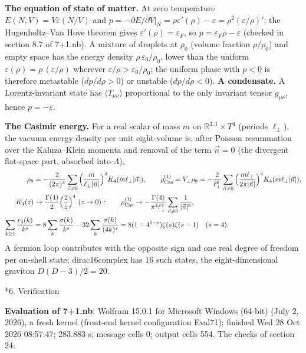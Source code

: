 \documentclass[10pt,a4paper]{article}
\makeatletter
\renewcommand\section{\@startsection{section}{1}{\z@}{-3.5ex \@plus -1ex \@minus -.2ex}{2.3ex \@plus.2ex}{\normalfont\Large\bfseries\raggedright}}
\makeatother
\begin{document}
\textbf{The equation of state of matter.} At zero temperature $E(N,V)=V\varepsilon(N/V)$ and $p=-\partial E/\partial V|_N=\rho\varepsilon'(\rho)-\varepsilon=\rho^2(\varepsilon/\rho)'$; the Hugenholtz–Van Hove theorem gives $\varepsilon'(\rho)=\varepsilon_F$, so $p=\varepsilon_F\rho-\varepsilon$ (checked in section 8.7 of 7+1.nb). A mixture of droplets at $\rho_0$ (volume fraction $\rho/\rho_0$) and empty space has the energy density $\rho\,\varepsilon_0/\rho_0$, lower than the uniform $\varepsilon(\rho)=\rho\,(\varepsilon/\rho)$ wherever $\varepsilon/\rho>\varepsilon_0/\rho_0$; the uniform phase with $p<0$ is therefore metastable ($dp/d\rho>0$) or unstable ($dp/d\rho<0$). \textbf{A condensate.} A Lorentz-invariant state has $\langle T_{\mu\nu}\rangle$ proportional to the only invariant tensor $g_{\mu\nu}$, hence $p=-\varepsilon$.

\textbf{The Casimir energy.} For a real scalar of mass $m$ on $\mathbb R^{3,1}\times T^4$ (periods $\ell_\perp$), the vacuum energy density per unit eight-volume is, after Poisson resummation over the Kaluza–Klein momenta and removal of the term $\vec n=0$ (the divergent flat-space part, absorbed into $\Lambda$),
\begin{align*}
\rho_8&=-\frac2{(2\pi)^4}\sum_{\vec n\ne0}\Big(\frac m{\ell_\perp|\vec n|}\Big)^4K_4(m\ell_\perp|\vec n|),\qquad \rho_{\rm Cas}^{(1)}=V_\perp\rho_8=-\frac2{\ell_\perp^4}\sum_{\vec n\ne0}\Big(\frac{m\ell_\perp}{2\pi|\vec n|}\Big)^4K_4(m\ell_\perp|\vec n|), \\
K_4(z)&\to\frac{\Gamma(4)}2\Big(\frac2z\Big)^4\ (z\to0):\qquad \rho_{\rm Cas}^{(1)}\to-\frac{\Gamma(4)}{\pi^4\ell_\perp^4}\sum_{\vec n\ne0}\frac1{|\vec n|^8}, \\
\sum_{k\ge1}\frac{r_4(k)}{k^s}&=8\sum_k\frac{\sigma(k)}{k^s}-32\sum_k\frac{\sigma(k)}{(4k)^s}=8(1-4^{1-s})\zeta(s)\zeta(s-1)\quad(s=4).
\end{align*}
A fermion loop contributes with the opposite sign and one real degree of freedom per on-shell state; dirac16complex has 16 such states, the eight-dimensional graviton $D(D-3)/2=20$.

\section*{6. Verification}
\textbf{Evaluation of 7+1.nb}: Wolfram 15.0.1 for Microsoft Windows (64-bit) (July 2, 2026), a fresh kernel (front-end kernel configuration Eval71); finished Wed 28 Oct 2026 08:57:47; 283.883 s; message cells 0; output cells 554. The checks of section 24:
\end{document}
